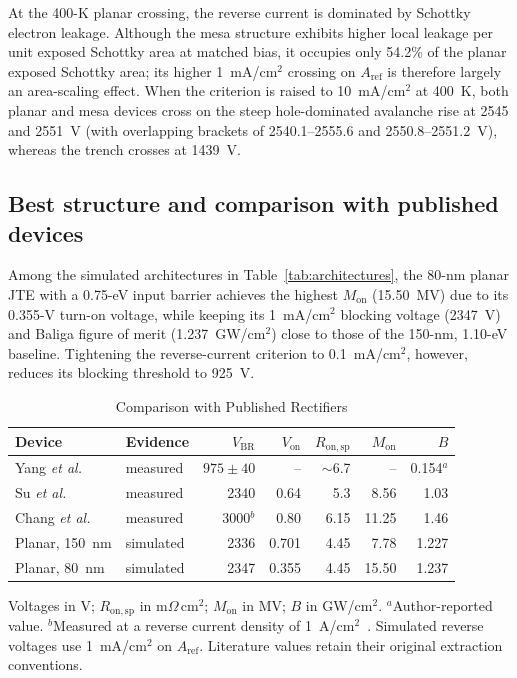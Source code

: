\documentclass[journal,10pt]{IEEEtran}
\newcommand{\Ron}{\ensuremath{R_{\mathrm{on,sp}}}}
\begin{document}
At the 400-K planar crossing, the reverse current is dominated by Schottky electron leakage. Although the mesa structure exhibits higher local leakage per unit exposed Schottky area at matched bias, it occupies only 54.2\% of the planar exposed Schottky area; its higher 1~mA/cm$^2$ crossing on $A_{\mathrm{ref}}$ is therefore largely an area-scaling effect. When the criterion is raised to 10~mA/cm$^2$ at 400~K, both planar and mesa devices cross on the steep hole-dominated avalanche rise at 2545 and 2551~V (with overlapping brackets of 2540.1--2555.6 and 2550.8--2551.2~V), whereas the trench crosses at 1439~V.

\subsection{Best structure and comparison with published devices}
Among the simulated architectures in Table~\ref{tab:architectures}, the 80-nm planar JTE with a 0.75-eV input barrier achieves the highest $M_{\mathrm{on}}$ (15.50~MV) due to its 0.355-V turn-on voltage, while keeping its 1~mA/cm$^2$ blocking voltage (2347~V) and Baliga figure of merit (1.237~GW/cm$^2$) close to those of the 150-nm, 1.10-eV baseline. Tightening the reverse-current criterion to 0.1~mA/cm$^2$, however, reduces its blocking threshold to 925~V.

\begin{table}[!t]
\caption{Comparison with Published Rectifiers}
\label{tab:literature}
\centering\scriptsize
\setlength{\tabcolsep}{1.5pt}
\begin{tabular}{>{\raggedright\arraybackslash}p{1.30cm}lrrrrr}
\toprule
Device & Evidence & $V_{\mathrm{BR}}$ & $V_{\mathrm{on}}$ & $\Ron$ & $M_{\mathrm{on}}$ & $B$\\
\midrule
Yang \emph{et al.}~\cite{Yang2017} & measured & $975\pm40$ & -- & $\sim$6.7 & -- & 0.154$^{a}$\\
Su \emph{et al.}~\cite{Su2024_APL} & measured & 2340 & 0.64 & 5.3 & 8.56 & 1.03\\
Chang \emph{et al.}~\cite{Chang2025_APL} & measured & 3000$^{b}$ & 0.80 & 6.15 & 11.25 & 1.46\\
Planar, 150~nm & simulated & 2336 & 0.701 & 4.45 & 7.78 & 1.227\\
Planar, 80~nm & simulated & 2347 & 0.355 & 4.45 & 15.50 & 1.237\\
\bottomrule
\end{tabular}
\par\smallskip\begin{minipage}{0.98\columnwidth}\footnotesize
Voltages in V; $\Ron$ in m$\Omega$\,cm$^2$; $M_{\mathrm{on}}$ in MV; $B$ in GW/cm$^2$. $^{a}$Author-reported value. $^{b}$Measured at a reverse current density of 1~A/cm$^2$~\cite{Chang2025_APL}. Simulated reverse voltages use 1~mA/cm$^2$ on $A_{\mathrm{ref}}$. Literature values retain their original extraction conventions.
\end{minipage}
\end{table}
\end{document}
